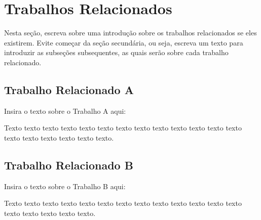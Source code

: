 \chapter{Trabalhos Relacionados}
\label{cap:trabalhos-relacionados}

Nesta seção, escreva sobre uma introdução sobre os trabalhos relacionados se eles existirem. Evite começar da seção secundária, ou seja, escreva um texto para introduzir as subseções subsequentes, as quais serão sobre cada trabalho relacionado.

\section{Trabalho Relacionado A}
\label{sec:trabalho-relacionado-a}

Insira o texto sobre o Trabalho A aqui:

Texto texto texto texto texto texto texto texto texto texto texto texto texto texto texto texto texto texto texto.

\section{Trabalho Relacionado B}
\label{sec:trabalho-relacionado-b}

Insira o texto sobre o Trabalho B aqui:

Texto texto texto texto texto texto texto texto texto texto texto texto texto texto texto texto texto texto.


